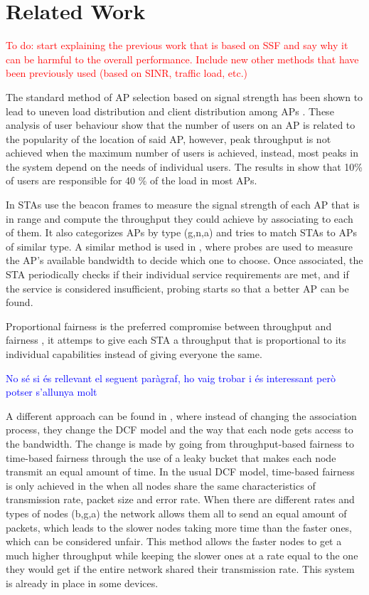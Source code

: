 \documentclass{article}
\begin{document}
\section{Related Work}
\label{section:related_work}
	\textcolor{red}{To do: start explaining the previous work that is based on SSF and say why it can be harmful to the overall performance. Include new other methods that have been previously used (based on SINR, traffic load, etc.)}
	
	The standard method of AP selection based on signal strength has been shown to lead to uneven load distribution and client distribution among APs \cite{anand2002, balazinska2003}. These analysis of user behaviour show that the number of users on an AP is related to the popularity of the location of said AP, however, peak throughput is not achieved when the maximum number of users is achieved, instead, most peaks in the system depend on the needs of individual users. The results in \cite{balazinska2003} show that 10\% of users are responsible for 40 \% of the load in most APs. 
	
	In \cite{gong2012} STAs use the beacon frames to measure the signal strength of each AP that is in range and compute the throughput they could achieve by associating to each of them. It also categorizes APs by type (g,n,a) and tries to match STAs to APs of similar type. A similar method is used in \cite{sun2004}, where probes are used to measure the AP's available bandwidth to decide which one to choose. Once associated, the STA periodically checks if their individual service requirements are met, and if the service is considered insufficient, probing starts so that a better AP can be found.
	
	Proportional fairness is the preferred compromise between throughput and fairness \cite{Li2014} \cite{amer2016}, it attemps to give each STA a throughput that is proportional to its individual capabilities instead of giving everyone the same. 
	
		\textcolor{blue}{No sé si és rellevant el seguent paràgraf, ho vaig trobar i és interessant però potser s'allunya molt}
		
	A different approach can be found in \cite{tan2004}, where instead of changing the association process, they change the DCF model and the way that each node gets access to the bandwidth. The change is made by going from throughput-based fairness to time-based fairness through the use of a leaky bucket that makes each node transmit an equal amount of time. In the usual DCF model, time-based fairness is only achieved in the  when all nodes share the same characteristics of transmission rate, packet size and error rate. When there are different rates and types of nodes (b,g,a) the network allows them all to send an equal amount of packets, which leads to the slower nodes taking more time than the faster ones, which can be considered unfair. This method allows the faster nodes to get a much higher throughput while keeping the slower ones at a rate equal to the one they would get if the entire network shared their transmission rate. This system is already in place in some devices\cite{aruba2010}.
	
\end{document}
